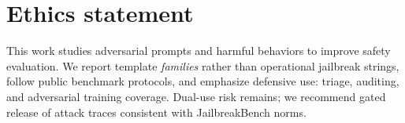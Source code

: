 \documentclass{article}
\begin{document}
\section{Ethics statement}

This work studies adversarial prompts and harmful behaviors to improve safety evaluation.
We report template \emph{families} rather than operational jailbreak strings, follow public benchmark protocols, and emphasize defensive use: triage, auditing, and adversarial training coverage.
Dual-use risk remains; we recommend gated release of attack traces consistent with JailbreakBench norms.
\end{document}
